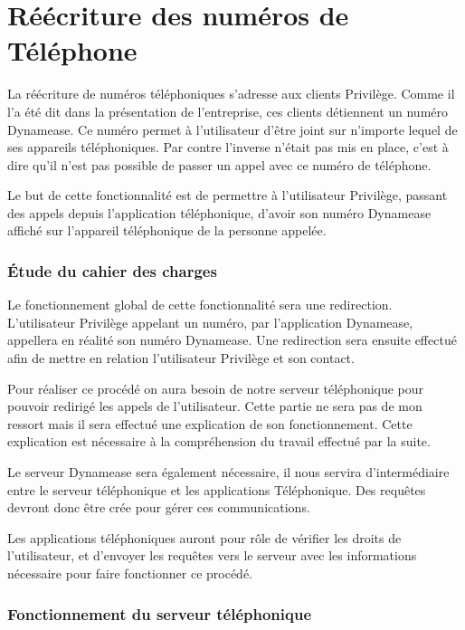 \section{Réécriture des numéros de Téléphone}

La réécriture de numéros téléphoniques s'adresse aux clients Privilège. Comme il l'a été dit dans la présentation de l'entreprise, ces clients détiennent un numéro Dynamease. Ce numéro permet à l'utilisateur d'être joint sur n'importe lequel de ses appareils téléphoniques. Par contre l'inverse n'était pas mis en place, c'est à dire qu'il n'est pas possible de passer un appel avec ce numéro de téléphone.

Le but de cette fonctionnalité est de permettre à l'utilisateur Privilège, passant des appels depuis l'application téléphonique, d'avoir son numéro Dynamease affiché sur l'appareil téléphonique de la personne appelée.

\subsubsection{Étude du cahier des charges}

Le fonctionnement global de cette fonctionnalité sera une redirection.
L'utilisateur Privilège appelant un numéro, par l'application Dynamease, appellera en réalité son numéro Dynamease. Une redirection sera ensuite effectué afin de mettre en relation l'utilisateur Privilège et son contact.

Pour réaliser ce procédé on aura besoin de notre serveur téléphonique pour pouvoir redirigé les appels de l'utilisateur. Cette partie ne sera pas de mon ressort mais il sera effectué une explication de son fonctionnement. Cette explication est nécessaire à la compréhension du travail effectué par la suite.

Le serveur Dynamease sera également nécessaire, il nous servira d'intermédiaire entre le serveur téléphonique et les applications Téléphonique. Des requêtes devront donc être crée pour gérer ces communications.

Les applications téléphoniques auront pour rôle de vérifier les droits de l'utilisateur, et d'envoyer les requêtes vers le serveur avec les informations nécessaire pour faire fonctionner ce procédé.

\subsubsection{Fonctionnement du serveur téléphonique}

